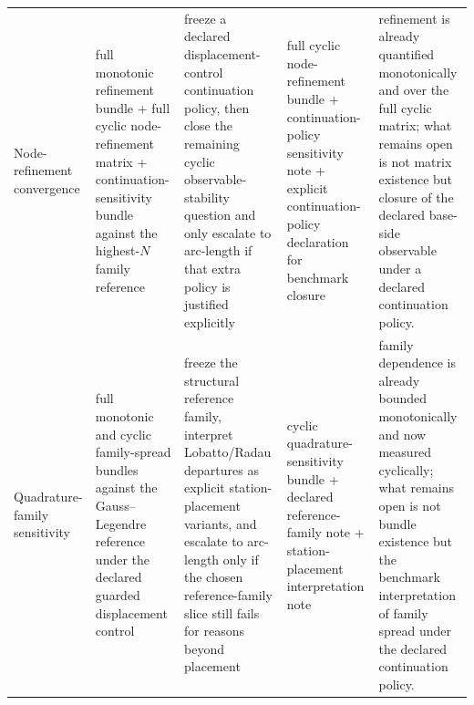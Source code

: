 \begin{table}[htbp]
\begin{tabularx}{\textwidth}{@{}p{}p{}p{}p{}X@{}}
    Node-refinement convergence
    & full monotonic refinement bundle + full cyclic node-refinement matrix +
      continuation-sensitivity bundle against the highest-\(N\) family reference
    & freeze a declared displacement-control continuation policy, then close
      the remaining cyclic observable-stability question and only escalate to
      arc-length if that extra policy is justified explicitly
    & full cyclic node-refinement bundle + continuation-policy sensitivity note
      + explicit continuation-policy declaration for benchmark closure
    & refinement is already quantified monotonically and over the full cyclic
      matrix; what remains open is not matrix existence but closure of the
      declared base-side observable under a declared continuation policy. \\[0.4mm]

    Quadrature-family sensitivity
    & full monotonic and cyclic family-spread bundles against the
      Gauss--Legendre reference under the declared guarded displacement control
    & freeze the structural reference family, interpret Lobatto/Radau
      departures as explicit station-placement variants, and escalate to
      arc-length only if the chosen reference-family slice still fails for
      reasons beyond placement
    & cyclic quadrature-sensitivity bundle + declared reference-family note +
      station-placement interpretation note
    & family dependence is already bounded monotonically and now measured
      cyclically; what remains open is not bundle existence but the benchmark
      interpretation of family spread under the declared continuation policy. \\
    \bottomrule
  \end{tabularx}
\end{table}

